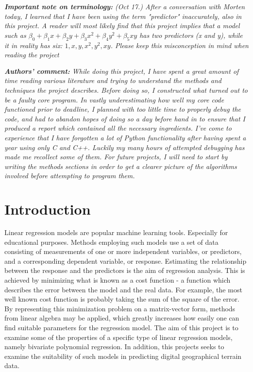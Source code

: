 \documentclass[%
oneside,                 %
final,                   %
10pt]{article}
\begin{document}
\textit{\textbf{Important note on terminology:} (Oct 17.)
 After a conversation with Morten today, I learned that I have been using the term "predictor" inaccurately, also in this project. A reader will most likely find that this project implies that a model such as $\beta_0 + \beta_1 x +\beta_2 y+ \beta_3 x^2+\beta_4 y^2+\beta_5 xy$ has two predictors (x and y), while it in reality has six: $1,x,y,x^2,y^2,xy$. Please keep this misconception in mind when reading the project} \newline


\textit{\textbf{Authors' comment:} While doing this project, I have spent a great amount of time reading various literature and trying to understand the methods and techniques the project describes. Before doing so, I constructed what turned out to be a faulty core program. In vastly underestimating how well my core code functioned prior to deadline, I planned with too little time to properly debug the code, and had to abandon hopes of doing so a day before hand in to ensure that I produced a report which contained all the necessary ingredients. I've come to experience that I have forgotten a lot of Python functionality after having spent a year using only C and C++. Luckily my many hours of attempted debugging has made me recollect some of them. For future projects, I will need to start by writing the methods sections in order to get a clearer picture of the algorithms involved before attempting to program them.}
\newpage

\section{Introduction}
Linear regression models are popular machine learning tools. Especially for educational purposes. Methods employing such models use a set of data consisting of measurements of one or more independent variables, or predictors, and a corresponding dependent variable, or response. Estimating the relationship between the response and the predictors is the aim of regression analysis. This is achieved by minimizing what is known as a cost function - a function which describes the error between the model and the real data. For example, the most well known cost function is probably taking the sum of the square of the error. By representing this minimization problem on a matrix-vector form, methods from linear algebra may be applied, which greatly increases how easily one can find suitable  parameters for the regression model.%
The aim of this project is to examine some of the properties of a specific type of linear regression models, namely bivariate polynomial regression. In addition, this projects seeks to examine the suitability of such models in predicting digital geographical terrain data.
\end{document}
